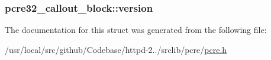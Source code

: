 \subsubsection[{\texorpdfstring{version}{version}}]{ pcre32\+\_\+callout\+\_\+block\+::version}\hypertarget{structpcre32__callout__block_a7c45f6537d446ae91695d370a1a175b6}{}\label{structpcre32__callout__block_a7c45f6537d446ae91695d370a1a175b6}


The documentation for this struct was generated from the following file\+:\begin{DoxyCompactItemize}
\item 
/usr/local/src/github/\+Codebase/httpd-\/2../srclib/pcre/\hyperlink{pcre_8h}{pcre.\+h}\end{DoxyCompactItemize}
